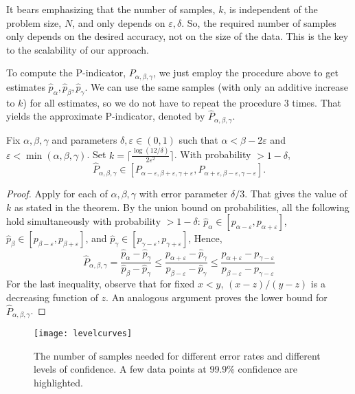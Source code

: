 \documentclass[final]{siamltex}
\newcommand{\cei}[1]{\lceil #1 \rceil}
\newcommand{\eps}{\varepsilon}
\newcommand{\pmetric}{P}
\newcommand{\pt}{{p}}
\newcommand{\samp}{k}
\begin{document}
It bears emphasizing that the number of  samples,  $\samp$, is independent of  the problem size, $N$, and only depends on $\eps,\delta$.
So, the required number of samples  only depends on the desired accuracy, not on the size of the data. This is
the key to the scalability of our approach.

To compute the \pmetric-indicator, $\pmetric_{\alpha,\beta,\gamma}$, we just employ the procedure
above to get estimates $\widehat{\pt}_{\alpha}, \widehat{\pt}_{\beta}, \widehat{\pt}_{\gamma}$.
We can use the same samples (with only an additive increase to $\samp$) for all estimates, so we do not have to repeat the procedure $3$ times.
That yields the approximate \pmetric-indicator, denoted by $\widehat{\pmetric}_{\alpha,\beta,\gamma}$.

\begin{theorem} \label{thm:pmetric} Fix $\alpha, \beta, \gamma$ and parameters $\delta, \eps \in (0,1)$
such that $\alpha < \beta - 2\eps$ and $\eps < \min(\alpha,\beta,\gamma)$. Set $\samp = \cei{\frac{\log(12/\delta)}{2\eps^2}}$.
With probability $>1-\delta$, 
\[ \widehat{\pmetric}_{\alpha,\beta,\gamma} \in [\pmetric_{\alpha-\eps,\beta+\eps,\gamma+\eps},\pmetric_{\alpha+\eps,\beta-\eps,\gamma-\eps}].\]
\end{theorem}

\begin{proof} Apply  for each of $\alpha, \beta, \gamma$ with error parameter $\delta/3$.
That gives the value of $\samp$ as stated in the theorem. By the union bound on probabilities,
all the following hold simultaneously with probability $>1-\delta$:
$\widehat{\pt}_{\alpha} \in [\pt_{\alpha-\eps},\pt_{\alpha+\eps}]$,
$\widehat{\pt}_{\beta} \in [\pt_{\beta-\eps},\pt_{\beta+\eps}]$, and
$\widehat{\pt}_{\gamma} \in [\pt_{\gamma-\eps},\pt_{\gamma+\eps}]$,
Hence,
$$ \widehat{\pmetric}_{\alpha,\beta,\gamma} = \frac{\widehat{\pt}_{\alpha} - \widehat{\pt}_{\gamma}}{\widehat{\pt}_\beta - \widehat{\pt}_\gamma}
\leq \frac{\pt_{\alpha+\eps} - \widehat{\pt}_{\gamma}}{\pt_{\beta-\eps} - \widehat{\pt}_\gamma}
\leq \frac{\pt_{\alpha+\eps} - \pt_{\gamma-\eps}}{\pt_{\beta-\eps} - \pt_{\gamma-\eps}} $$
For the last inequality, observe that for fixed $x < y$, $(x-z)/(y-z)$ is a decreasing function of $z$.
An analogous argument proves the lower bound for $\widehat{\pmetric}_{\alpha,\beta,\gamma}$.
\end{proof}

\begin{figure}[thbp] 
   \centering
   \texttt{[image: levelcurves]} 
   \caption{ The number of samples needed for different error rates and
    different levels of confidence. A few data points at 99.9\%
    confidence are highlighted.}
   \label{fig:levelcurves}
\end{figure}
\end{document}
